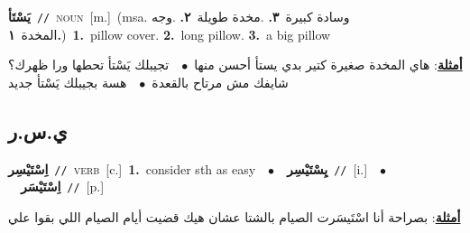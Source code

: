 \documentclass[10pt,a4paper,twoside]{article} %
\begin{document}
\begin{multicols}{2}
{{{{\setlength\topsep{0pt}\textbf{\foreignlanguage{arabic}{يَسْتَأ}}\ {\color{gray}\texttt{//}\color{black}}\ \textsc{noun}\ [m.]\ \color{gray}(msa. \foreignlanguage{arabic}{وسادة كبيرة}~\foreignlanguage{arabic}{\textbf{٣.}}  .\foreignlanguage{arabic}{مخدة طويلة}~\foreignlanguage{arabic}{\textbf{٢.}}  .\foreignlanguage{arabic}{وجه المخدة}~\foreignlanguage{arabic}{\textbf{١.}})\color{black}\ \textbf{1.}~pillow cover.  \textbf{2.}~long pillow.  \textbf{3.}~a big pillow\  \begin{flushright}\color{gray}\foreignlanguage{arabic}{\textbf{\underline{\foreignlanguage{arabic}{أمثلة}}}: هاي المخدة صغيرة كتير بدي يستأ أحسن منها\ $\bullet$\ \  تجيبلك يَسْتأ تحطها ورا ظهرك؟ شايفك مش مرتاح بالقعدة\ $\bullet$\ \  هسة بجيبلك يَسْتأ جديد}\end{flushright}\color{black}} \vspace{2mm}

\vspace{-3mm}
\subsection*{\color{blue}\foreignlanguage{arabic}{ي.س.ر}\color{blue}{}} 

{\setlength\topsep{0pt}\textbf{\foreignlanguage{arabic}{اِسْتَيْسِر}}\ {\color{gray}\texttt{//}\color{black}}\ \textsc{verb}\ [c.]\ \textbf{1.}~consider sth as easy\ \ $\bullet$\ \ \setlength\topsep{0pt}\textbf{\foreignlanguage{arabic}{يِسْتَيْسِر}}\ {\color{gray}\texttt{//}\color{black}}\ [i.]\ \ $\bullet$\ \ \setlength\topsep{0pt}\textbf{\foreignlanguage{arabic}{اِسْتَيْسَر}}\ {\color{gray}\texttt{//}\color{black}}\ [p.]\  \begin{flushright}\color{gray}\foreignlanguage{arabic}{\textbf{\underline{\foreignlanguage{arabic}{أمثلة}}}: بصراحة أنا اسْتَيسَرت الصيام بالشتا عشان هيك قضيت أيام الصيام اللي بقوا علي}\end{flushright}\color{black}} \vspace{2mm}

}}}
\end{multicols}
\end{document}
